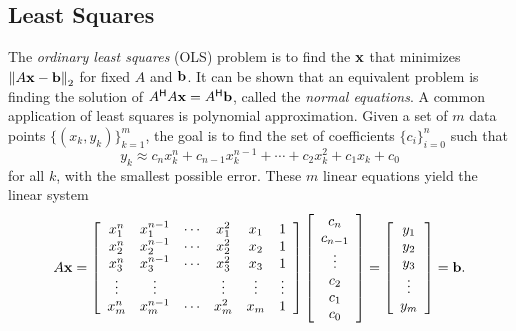 \subsection*{Least Squares} %

The \emph{ordinary least squares} (OLS) problem is to find the $\mathbf{x}$ that minimizes $\left\lVert A\mathbf{x} -\mathbf{b}\right\rVert_2$ for fixed $A$ and $\mathbf{b}$.
It can be shown that an equivalent problem is finding the solution of $A^{\mathsf H} A\mathbf{x} =A^{\mathsf H} \mathbf{b}$, called the \emph{normal equations}.
%
A common application of least squares is polynomial approximation.
Given a set of $m$ data points $\{(x_k, y_k)\}_{k=1}^m$, the goal is to find the set of coefficients $\{c_i\}_{i=0}^n$ such that
\[
y_k \approx c_n x_k^n + c_{n-1} x_k^{n-1} + \cdots + c_2 x_k^2 + c_1 x_k + c_0
\]
for all $k$, with the smallest possible error.
These $m$ linear equations yield the linear system
\begin{equation}
A\mathbf{x} =
\left[\begin{array}{cccccc}
x_1^n & x_1^{n-1} & \cdots & x_1^2 & x_1 & 1 \\
x_2^n & x_2^{n-1} & \cdots & x_2^2 & x_2 & 1 \\
x_3^n & x_3^{n-1} & \cdots & x_3^2 & x_3 & 1 \\
\vdots & \vdots & & \vdots & \vdots & \vdots \\
x_m^n & x_m^{n-1} & \cdots & x_m^2 & x_m & 1 \\
\end{array}\right]
\left[\begin{array}{c}
c_n \\ c_{n-1} \\ \vdots \\ c_2 \\ c_1 \\ c_0
\end{array}\right]
=
\left[\begin{array}{c} y_1 \\ y_2 \\ y_3 \\ \vdots \\ y_m \end{array}\right]
= \mathbf{b}.
\label{eq:condstab-poly-leastsq}
\end{equation}

